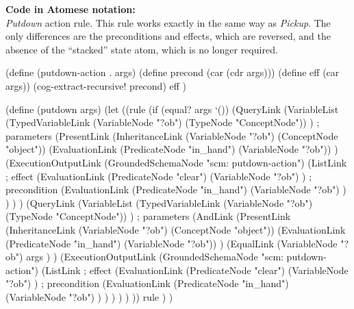 \begin{footnotesize}
\textbf{Code in Atomese notation:} \\
\textit{Putdown} action rule. This rule works exactly in the same way as \textit{Pickup}. The only differences are the preconditions and effects, which are reversed, and the absence of the \enquote{stacked} state atom, which is no longer required. 
\end{footnotesize}

\begin{python}
(define (putdown-action . args)
  (define precond (car (cdr args)))
  (define eff (car args))
  (cog-extract-recursive! precond)
  eff
)

(define (putdown args)
  (let
    ((rule
      (if (equal? args `())
        (QueryLink
          (VariableList
            (TypedVariableLink
              (VariableNode "?ob") 
              (TypeNode "ConceptNode"))
          ) ; parameters
          (PresentLink
            (InheritanceLink
              (VariableNode "?ob")
              (ConceptNode "object"))
            (EvaluationLink
              (PredicateNode "in_hand")
              (VariableNode "?ob"))
          )
          (ExecutionOutputLink
            (GroundedSchemaNode "scm: putdown-action")
            (ListLink
              ; effect
              (EvaluationLink
                (PredicateNode "clear")
                (VariableNode "?ob")
              )
              ; precondition
              (EvaluationLink
                (PredicateNode "in_hand")
                (VariableNode "?ob")
              )
            )
          )
        )
        (QueryLink
          (VariableList
            (TypedVariableLink
              (VariableNode "?ob") 
              (TypeNode "ConceptNode"))
          ) ; parameters
          (AndLink
            (PresentLink
              (InheritanceLink
                (VariableNode "?ob")
                (ConceptNode "object"))
              (EvaluationLink
                (PredicateNode "in_hand")
                (VariableNode "?ob"))
            )
            (EqualLink
              (VariableNode "?ob")
              args
            )
          )
          (ExecutionOutputLink
            (GroundedSchemaNode "scm: putdown-action")
            (ListLink
              ; effect
              (EvaluationLink
                (PredicateNode "clear")
                (VariableNode "?ob")
              )
              ; precondition
              (EvaluationLink
                (PredicateNode "in_hand")
                (VariableNode "?ob")
              )
            )
          )
        )
      )
    ))
    rule
  )
)
\end{python}

